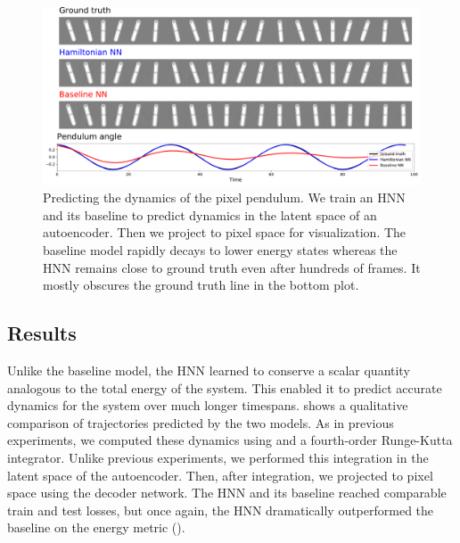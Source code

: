 \documentclass{article}
\begin{document}
\begin{figure}[h!]
\centering
\includegraphics[width=\textwidth]{static/pendulum-compare-static}
\caption{Predicting the dynamics of the pixel pendulum. We train an HNN and its baseline to predict dynamics in the latent space of an autoencoder. Then we project to pixel space for visualization. The baseline model rapidly decays to lower energy states whereas the HNN remains close to ground truth even after hundreds of frames. It mostly obscures the ground truth line in the bottom plot.}
\end{figure}

\subsection{Results}

Unlike the baseline model, the HNN learned to conserve a scalar quantity analogous to the total energy of the system. This enabled it to predict accurate dynamics for the system over much longer timespans.  shows a qualitative comparison of trajectories predicted by the two models. As in previous experiments, we computed these dynamics using  and a fourth-order Runge-Kutta integrator. Unlike previous experiments, we performed this integration in the latent space of the autoencoder. Then, after integration, we projected to pixel space using the decoder network. The HNN and its baseline reached comparable train and test losses, but once again, the HNN dramatically outperformed the baseline on the energy metric ().

\end{document}
